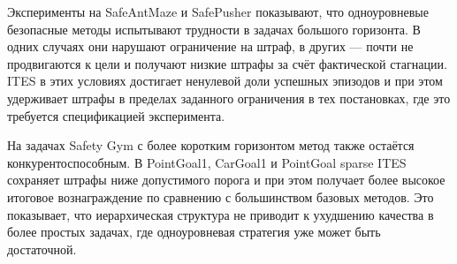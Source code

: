 Эксперименты на SafeAntMaze и SafePusher показывают, что одноуровневые безопасные методы испытывают трудности в задачах большого горизонта. В одних случаях они нарушают ограничение на штраф, в других --- почти не продвигаются к цели и получают низкие штрафы за счёт фактической стагнации. ITES в этих условиях достигает ненулевой доли успешных эпизодов и при этом удерживает штрафы в пределах заданного ограничения в тех постановках, где это требуется спецификацией эксперимента.

На задачах Safety Gym с более коротким горизонтом метод также остаётся конкурентоспособным. В PointGoal1, CarGoal1 и PointGoal sparse ITES сохраняет штрафы ниже допустимого порога и при этом получает более высокое итоговое вознаграждение по сравнению с большинством базовых методов. Это показывает, что иерархическая структура не приводит к ухудшению качества в более простых задачах, где одноуровневая стратегия уже может быть достаточной.

